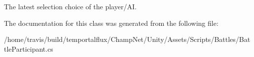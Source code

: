 The latest selection choice of the player/\-A\-I. 



The documentation for this class was generated from the following file\-:\begin{DoxyCompactItemize}
\item 
/home/travis/build/temportalflux/\-Champ\-Net/\-Unity/\-Assets/\-Scripts/\-Battles/Battle\-Participant.\-cs\end{DoxyCompactItemize}
